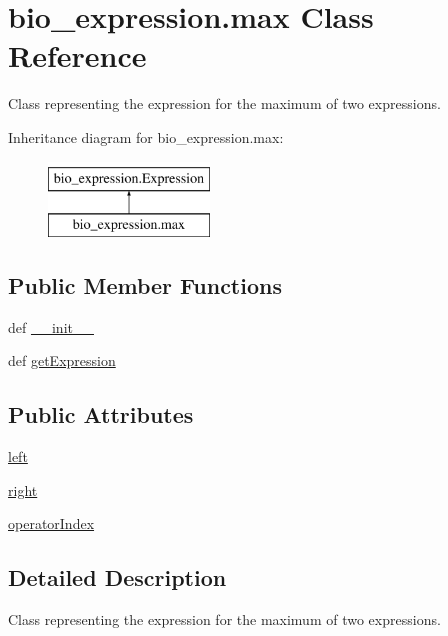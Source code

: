 \hypertarget{classbio__expression_1_1max}{\section{bio\+\_\+expression.\+max Class Reference}
\label{classbio__expression_1_1max}
}


Class representing the expression for the maximum of two expressions.  


Inheritance diagram for bio\+\_\+expression.\+max\+:\begin{figure}[H]
\begin{center}
\leavevmode
\includegraphics[height=2.000000cm]{d2/d49/classbio__expression_1_1max}
\end{center}
\end{figure}
\subsection*{Public Member Functions}
\begin{DoxyCompactItemize}
\item 
def \hyperlink{classbio__expression_1_1max_a3d18dc0b071976582eba9781809ad9d0}{\+\_\+\+\_\+init\+\_\+\+\_\+}
\item 
def \hyperlink{classbio__expression_1_1max_a1021bdf64900a2141409b00d9e4b994d}{get\+Expression}
\end{DoxyCompactItemize}
\subsection*{Public Attributes}
\begin{DoxyCompactItemize}
\item 
\hyperlink{classbio__expression_1_1max_a698892d9ef10ee244e421ebb437b82d3}{left}
\item 
\hyperlink{classbio__expression_1_1max_afc52928c47bc1e28c66dab84a03f7be3}{right}
\item 
\hyperlink{classbio__expression_1_1max_af109235d76eb1e03329a9b272d72d669}{operator\+Index}
\end{DoxyCompactItemize}


\subsection{Detailed Description}
Class representing the expression for the maximum of two expressions. 

